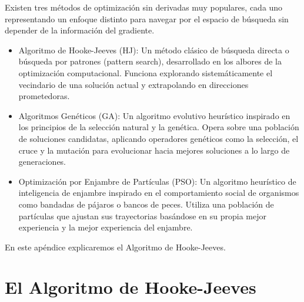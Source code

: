 Existen tres métodos de optimización sin derivadas muy populares, cada uno representando un enfoque distinto para navegar por el espacio de búsqueda sin depender de la información del gradiente.
\begin{itemize}
    \item Algoritmo de Hooke-Jeeves (HJ): Un método clásico de búsqueda directa o búsqueda por patrones (pattern search), desarrollado en los albores de la optimización computacional. Funciona explorando sistemáticamente el vecindario de una solución actual y extrapolando en direcciones prometedoras.
    \item Algoritmos Genéticos (GA): Un algoritmo evolutivo heurístico inspirado en los principios de la selección natural y la genética. Opera sobre una población de soluciones candidatas, aplicando operadores genéticos como la selección, el cruce y la mutación para evolucionar hacia mejores soluciones a lo largo de generaciones.
    \item Optimización por Enjambre de Partículas (PSO): Un algoritmo heurístico de inteligencia de enjambre inspirado en el comportamiento social de organismos como bandadas de pájaros o bancos de peces. Utiliza una población de partículas que ajustan sus trayectorias basándose en su propia mejor experiencia y la mejor experiencia del enjambre.
\end{itemize}
En este apéndice explicaremos el Algoritmo de Hooke-Jeeves.

\section{El Algoritmo de Hooke-Jeeves}

